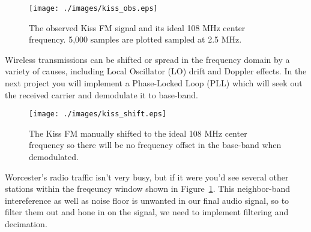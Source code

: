 \documentclass[letterpaper,12pt]{article}
\begin{document}
\begin{figure}[h]
 \centering
 \texttt{[image: ./images/kiss\_obs.eps]}
 \caption{The observed Kiss FM signal and its ideal 108 MHz center frequency. 5,000 samples are plotted sampled at 2.5 MHz.}\label{f:kiss_obs}
\end{figure}


Wireless transmissions can be shifted or spread in the frequency domain by a variety of causes, including Local Oscillator (LO) drift and Doppler effects. In the next project you will implement a Phase-Locked Loop (PLL) which will seek out the received carrier and demodulate it to base-band.




\begin{figure}[h]
 \centering
 \texttt{[image: ./images/kiss\_shift.eps]}
 \caption{The Kiss FM manually shifted to the ideal 108 MHz center frequency so there will be no frequency offset in the base-band when demodulated.}\label{f:kiss_shift}
\end{figure}


Worcester's radio traffic isn't very busy, but if it were you'd see several other stations within the freqeuncy window shown in Figure~\ref{f:kiss_obs}. This neighbor-band intereference as well as noise floor is unwanted in our final audio signal, so to filter them out and hone in on the signal, we need to implement filtering and decimation.

\end{document}
